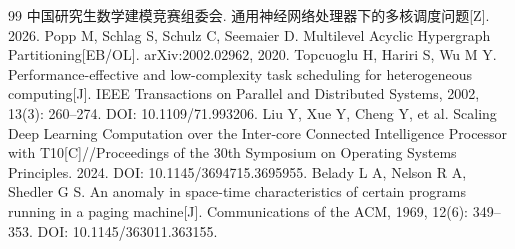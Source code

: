 \begin{thebibliography}{99}
 中国研究生数学建模竞赛组委会. 通用神经网络处理器下的多核调度问题[Z]. 2026.
 Popp M, Schlag S, Schulz C, Seemaier D. Multilevel Acyclic Hypergraph Partitioning[EB/OL]. arXiv:2002.02962, 2020.
 Topcuoglu H, Hariri S, Wu M Y. Performance-effective and low-complexity task scheduling for heterogeneous computing[J]. IEEE Transactions on Parallel and Distributed Systems, 2002, 13(3): 260--274. DOI: 10.1109/71.993206.
 Liu Y, Xue Y, Cheng Y, et al. Scaling Deep Learning Computation over the Inter-core Connected Intelligence Processor with T10[C]//Proceedings of the 30th Symposium on Operating Systems Principles. 2024. DOI: 10.1145/3694715.3695955.
 Belady L A, Nelson R A, Shedler G S. An anomaly in space-time characteristics of certain programs running in a paging machine[J]. Communications of the ACM, 1969, 12(6): 349--353. DOI: 10.1145/363011.363155.
\end{thebibliography}
